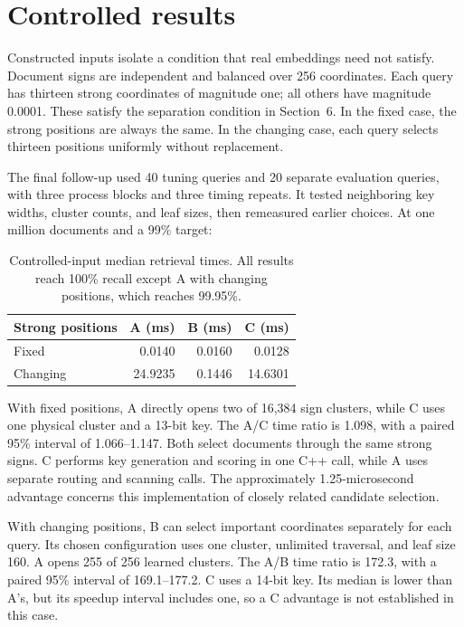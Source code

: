 \documentclass[11pt,a4paper]{article}
\begin{document}
\newpage
\section{Controlled results}
Constructed inputs isolate a condition that real embeddings need not satisfy. Document signs
are independent and balanced over 256 coordinates. Each query has thirteen strong coordinates
of magnitude one; all others have magnitude 0.0001. These satisfy the separation condition
in Section~6. In the fixed case, the strong positions are always the same. In the changing
case, each query selects thirteen positions uniformly without replacement.

The final follow-up used 40 tuning queries and 20 separate evaluation queries, with three
process blocks and three timing repeats. It tested neighboring key widths, cluster counts,
and leaf sizes, then remeasured earlier choices. At one million documents and a 99\% target:
\begin{table}[h]\centering
\caption{Controlled-input median retrieval times. All results reach 100\% recall except A
with changing positions, which reaches 99.95\%.}
\begin{tabular}{@{}lrrr@{}}\toprule
Strong positions & A (ms) & B (ms) & C (ms)\\\midrule
Fixed & 0.0140 & 0.0160 & 0.0128\\
Changing & 24.9235 & 0.1446 & 14.6301\\\bottomrule
\end{tabular}
\end{table}

With fixed positions, A directly opens two of 16,384 sign clusters, while C uses one
physical cluster and a 13-bit key. The A/C time ratio is 1.098, with a paired 95\% interval
of 1.066--1.147. Both select documents through the same strong signs. C performs key
generation and scoring in one C++ call, while A uses separate routing and scanning calls.
The approximately 1.25-microsecond advantage concerns this implementation of closely
related candidate selection.

With changing positions, B can select important coordinates separately for each query. Its
chosen configuration uses one cluster, unlimited traversal, and leaf size 160. A opens
255 of 256 learned clusters. The A/B time ratio is 172.3, with a paired 95\% interval of
169.1--177.2. C uses a 14-bit key. Its median is lower than A's, but its speedup interval
includes one, so a C advantage is not established in this case.
\end{document}
